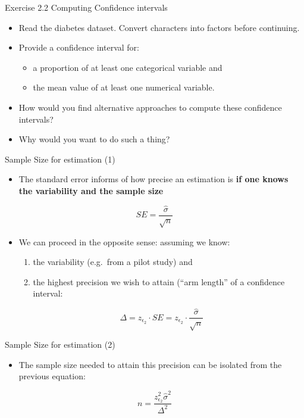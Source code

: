 \documentclass[
  ignorenonframetext,
]{beamer}
\providecommand{\tightlist}{%
  \setlength{\itemsep}{0pt}\setlength{\parskip}{0pt}}
\begin{document}
\begin{frame}{Exercise 2.2 Computing Confidence intervals}
\protect\hypertarget{exercise-2.2-computing-confidence-intervals}{}
\begin{itemize}
\item
  Read the diabetes dataset. Convert characters into factors before
  continuing.
\item
  Provide a confidence interval for:

  \begin{itemize}
  \tightlist
  \item
    a proportion of at least one categorical variable and
  \item
    the mean value of at least one numerical variable.
  \end{itemize}
\item
  How would you find alternative approaches to compute these confidence
  intervals?
\item
  Why would you want to do such a thing?
\end{itemize}
\end{frame}

\begin{frame}{Sample Size for estimation (1)}
\protect\hypertarget{sample-size-for-estimation-1}{}
\begin{itemize}
\tightlist
\item
  The standard error informs of how precise an estimation is \textbf{if
  one knows the variability and the sample size}
\end{itemize}

\[
SE =\frac{ \hat \sigma}{\sqrt{n}}
\]

\begin{itemize}
\item
  We can proceed in the opposite sense: assuming we know:

  \begin{enumerate}
  [(1)]
  \tightlist
  \item
    the variability (e.g.~from a pilot study) and
  \item
    the highest precision we wish to attain (``arm length'' of a
    confidence interval:
  \end{enumerate}

  \[
     \Delta = z_{\epsilon_2} \cdot SE = z_{\epsilon_2} \cdot \frac{ \hat \sigma}{\sqrt{n}}
     \]
\end{itemize}
\end{frame}

\begin{frame}{Sample Size for estimation (2)}
\protect\hypertarget{sample-size-for-estimation-2}{}
\begin{itemize}
\tightlist
\item
  The sample size needed to attain this precision can be isolated from
  the previous equation:
\end{itemize}

\[
n= \frac{z_{\epsilon_2} ^2 \hat  \sigma ^2}{\Delta^2}
\]
\end{frame}
\end{document}
